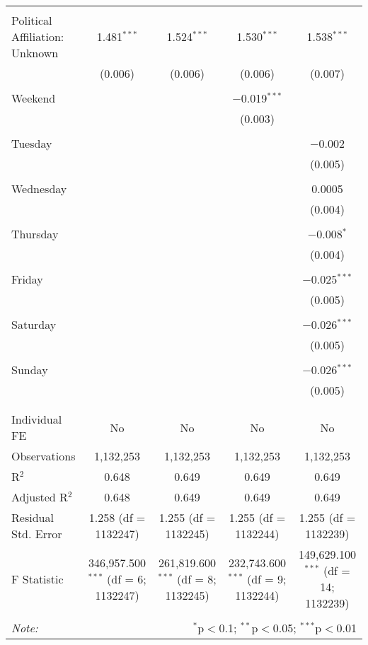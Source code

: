 \documentclass[
]{article}
\begin{document}
\begin{table}[!htbp]
{\begin{tabular}{@{\extracolsep{5pt}}lcccc}
  & & & & \\ 
 Political Affiliation: Unknown & 1.481$^{***}$ & 1.524$^{***}$ & 1.530$^{***}$ & 1.538$^{***}$ \\ 
  & (0.006) & (0.006) & (0.006) & (0.007) \\ 
  & & & & \\ 
 Weekend &  &  & $-$0.019$^{***}$ &  \\ 
  &  &  & (0.003) &  \\ 
  & & & & \\ 
 Tuesday &  &  &  & $-$0.002 \\ 
  &  &  &  & (0.005) \\ 
  & & & & \\ 
 Wednesday &  &  &  & 0.0005 \\ 
  &  &  &  & (0.004) \\ 
  & & & & \\ 
 Thursday &  &  &  & $-$0.008$^{*}$ \\ 
  &  &  &  & (0.004) \\ 
  & & & & \\ 
 Friday &  &  &  & $-$0.025$^{***}$ \\ 
  &  &  &  & (0.005) \\ 
  & & & & \\ 
 Saturday &  &  &  & $-$0.026$^{***}$ \\ 
  &  &  &  & (0.005) \\ 
  & & & & \\ 
 Sunday &  &  &  & $-$0.026$^{***}$ \\ 
  &  &  &  & (0.005) \\ 
  & & & & \\ 
\hline \\[-1.8ex] 
Individual FE & No & No & No & No \\ 
Observations & 1,132,253 & 1,132,253 & 1,132,253 & 1,132,253 \\ 
R$^{2}$ & 0.648 & 0.649 & 0.649 & 0.649 \\ 
Adjusted R$^{2}$ & 0.648 & 0.649 & 0.649 & 0.649 \\ 
Residual Std. Error & 1.258 (df = 1132247) & 1.255 (df = 1132245) & 1.255 (df = 1132244) & 1.255 (df = 1132239) \\ 
F Statistic & 346,957.500$^{***}$ (df = 6; 1132247) & 261,819.600$^{***}$ (df = 8; 1132245) & 232,743.600$^{***}$ (df = 9; 1132244) & 149,629.100$^{***}$ (df = 14; 1132239) \\ 
\hline 
\hline \\[-1.8ex] 
\textit{Note:}  & \multicolumn{4}{r}{$^{*}$p$<$0.1; $^{**}$p$<$0.05; $^{***}$p$<$0.01} \\ 
\end{tabular}
} 
\end{table} 
\newpage
\end{document}
